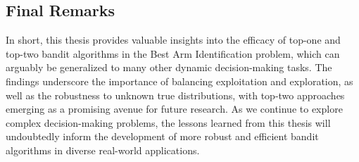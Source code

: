 \documentclass[a4paper, 12pt]{article}
\theoremstyle{definition}
\begin{document}
\subsection{Final Remarks}
In short, this thesis provides valuable insights into the efficacy of top-one and top-two bandit algorithms in the Best Arm Identification problem, which can arguably be generalized to many other dynamic decision-making tasks. The findings underscore the importance of balancing exploitation and exploration, as well as the robustness to unknown true distributions, with top-two approaches emerging as a promising avenue for future research. As we continue to explore complex decision-making problems, the lessons learned from this thesis will undoubtedly inform the development of more robust and efficient bandit algorithms in diverse real-world applications.



\newpage



\end{document}
